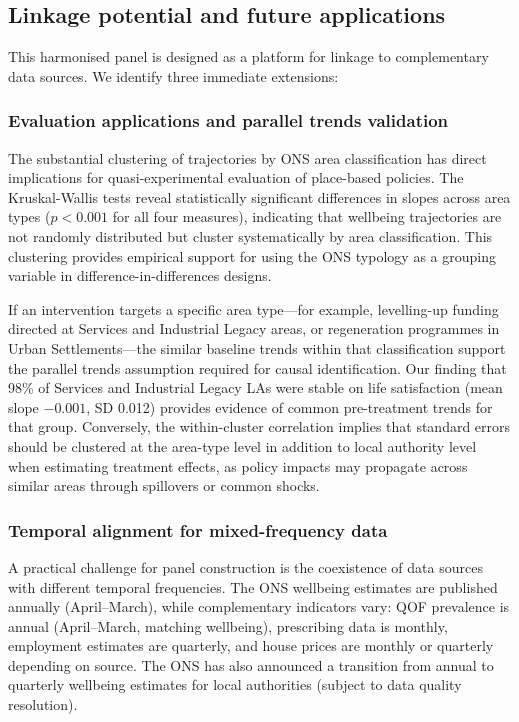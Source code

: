 \documentclass[12pt,a4paper]{article}
\begin{document}
\subsection{Linkage potential and future applications}

This harmonised panel is designed as a platform for linkage to complementary data sources. We identify three immediate extensions:

\subsubsection{Evaluation applications and parallel trends validation}

The substantial clustering of trajectories by ONS area classification has direct implications for quasi-experimental evaluation of place-based policies. The Kruskal-Wallis tests reveal statistically significant differences in slopes across area types ($p < 0.001$ for all four measures), indicating that wellbeing trajectories are not randomly distributed but cluster systematically by area classification. This clustering provides empirical support for using the ONS typology as a grouping variable in difference-in-differences designs.

If an intervention targets a specific area type---for example, levelling-up funding directed at Services and Industrial Legacy areas, or regeneration programmes in Urban Settlements---the similar baseline trends within that classification support the parallel trends assumption required for causal identification. Our finding that 98\% of Services and Industrial Legacy LAs were stable on life satisfaction (mean slope $-0.001$, SD 0.012) provides evidence of common pre-treatment trends for that group. Conversely, the within-cluster correlation implies that standard errors should be clustered at the area-type level in addition to local authority level when estimating treatment effects, as policy impacts may propagate across similar areas through spillovers or common shocks.

\subsubsection{Temporal alignment for mixed-frequency data}

A practical challenge for panel construction is the coexistence of data sources with different temporal frequencies. The ONS wellbeing estimates are published annually (April--March), while complementary indicators vary: QOF prevalence is annual (April--March, matching wellbeing), prescribing data is monthly, employment estimates are quarterly, and house prices are monthly or quarterly depending on source. The ONS has also announced a transition from annual to quarterly wellbeing estimates for local authorities (subject to data quality resolution).
\end{document}
